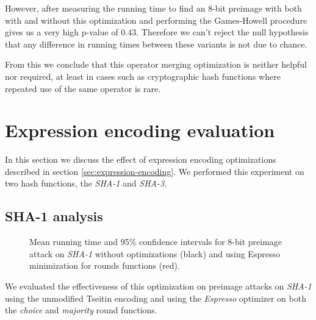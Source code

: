 However, after measuring the running time to find an $8$-bit preimage with both with and without this optimization and performing the Games-Howell procedure gives us a very high p-value of $0.43$.
Therefore we can't reject the null hypothesis that any difference in running times between these variants is not due to chance.

From this we conclude that this operator merging optimization is neither helpful nor required, at least in cases such as cryptographic hash functions where repeated use of the same operator is rare.

\section{Expression encoding evaluation}
\label{sec:expression-encoding-eval}
In this section we discuss the effect of expression encoding optimizations described in section \ref{sec:expression-encoding}.
We performed this experiment on two hash functions, the \emph{SHA-1} and \emph{SHA-3}.

\subsection{SHA-1 analysis}

\begin{figure}	
\caption{Mean running time and 95\% confidence intervals for $8$-bit preimage attack on \emph{SHA-1} without optimizations (black) and using Espresso minimization for rounds functions (red).}
\label{fig:opt-sha1-cmp-espresso}
\end{figure}

We evaluated the effectiveness of this optimization on preimage attacks on \emph{SHA-1} using the unmodified Tseitin encoding and using the \emph{Espresso} optimizer on both the \emph{choice} and \emph{majority} round functions.

